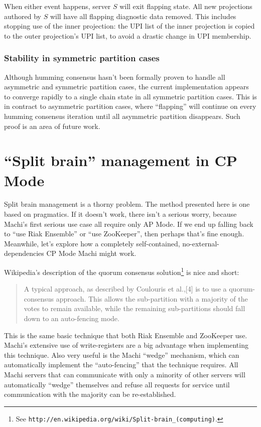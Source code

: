 \documentclass[preprint,10pt]{sigplanconf}
\begin{document}
When either event happens, server $S$ will exit flapping state.  All
new projections authored by $S$ will have all flapping diagnostic data
removed.  This includes stopping use of the inner projection: the UPI
list of the inner projection is copied to the outer projection's UPI
list, to avoid a drastic change in UPI membership.

\subsubsection{Stability in symmetric partition cases}

Although humming consensus hasn't been formally proven to handle all
asymmetric and symmetric partition cases, the current implementation
appears to converge rapidly to a single chain state in all symmetric
partition cases.  This is in contract to asymmetric partition cases,
where ``flapping'' will continue on every humming consensus iteration
until all asymmetric partition disappears.  Such proof is an area of
future work.

\section{``Split brain'' management in CP Mode}
\label{sec:split-brain-management}

Split brain management is a thorny problem.  The method presented here
is one based on pragmatics.  If it doesn't work, there isn't a serious
worry, because Machi's first serious use case all require only AP Mode.
If we end up falling back to ``use Riak Ensemble'' or ``use ZooKeeper'',
then perhaps that's
fine enough.  Meanwhile, let's explore how a
completely self-contained, no-external-dependencies
CP Mode Machi might work.

Wikipedia's description of the quorum consensus solution\footnote{See
  {\tt http://en.wikipedia.org/wiki/Split-brain\_(computing)}.} is nice
and short:

\begin{quotation}
A typical approach, as described by Coulouris et al.,[4] is to use a
quorum-consensus approach. This allows the sub-partition with a
majority of the votes to remain available, while the remaining
sub-partitions should fall down to an auto-fencing mode.
\end{quotation}

This is the same basic technique that
both Riak Ensemble and ZooKeeper use.  Machi's
extensive use of write-registers are a big advantage when implementing
this technique.  Also very useful is the Machi ``wedge'' mechanism,
which can automatically implement the ``auto-fencing'' that the
technique requires.  All Machi servers that can communicate with only
a minority of other servers will automatically ``wedge'' themselves
and refuse all requests for service until communication with the
majority can be re-established.
\end{document}
